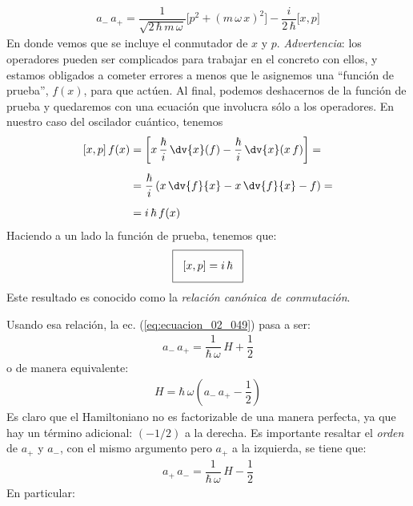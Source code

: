 \begin{align}
a_{-} \, a_{+} = \dfrac{1}{\sqrt{2 \, \hbar \, m \, \omega }} \big[ p^{2} + (m \, \omega \, x)^{2} \big] - \dfrac{i}{2 \, \hbar} \big[ x , p \big]
\label{eq:ecuacion_02_049}
\end{align}
En donde vemos que se incluye el conmutador de $x$ y $p$. 
\emph{Advertencia}: los operadores pueden ser complicados para trabajar en el concreto con ellos, y estamos obligados a cometer errores a menos que le asignemos una \enquote{función de prueba}, $f (x)$, para que actúen. Al final, podemos deshacernos de la función de prueba y quedaremos con una ecuación que involucra sólo a los operadores. En nuestro caso del oscilador cuántico, tenemos
\begin{align}
\begin{aligned}[b]
[x, p] \, f(x) &= \left[ x \, \dfrac{\hbar}{i} \, \dv{x} (f) - \dfrac{\hbar}{i} \, \dv{x} (x \, f) \right] = \\[0.5em]
&= \dfrac{\hbar}{i} \left( x \, \dv{f}{x} - x \,\dv{f}{x} - f \right) = \\[0.5em]
&= i \, \hbar \, f(x)
\end{aligned}
\label{eq:ecuacion_02_050}
\end{align}
Haciendo a un lado la función de prueba, tenemos que:
\begin{align}
\setlength{\fboxsep}{3\fboxsep}\boxed{
[x, p] = i \, \hbar
}
\label{eq:ecuacion_02_051}
\end{align}
Este resultado es conocido como la \emph{relación canónica de conmutación}.
\par
Usando esa relación, la ec. (\ref{eq:ecuacion_02_049}) pasa a ser:
\begin{align}
a_{-} \, a_{+} = \dfrac{1}{\hbar \, \omega} \, H + \dfrac{1}{2}
\label{ec:ecuacion_02_052}
\end{align}
o de manera equivalente:
\begin{align}
H = \hbar \, \omega \left( a_{-} \, a_{+} - \dfrac{1}{2} \right)
\label{ec:ecuacion_02_053}
\end{align}
Es claro que el Hamiltoniano no es factorizable de una manera perfecta, ya que hay un término adicional: $(-1/2)$ a la derecha. Es importante resaltar el \emph{orden} de $a_{+}$ y $a_{-}$, con el mismo argumento pero $a_{+}$ a la izquierda, se tiene que:
\begin{align}
a_{+} \, a_{-} = \dfrac{1}{\hbar \, \omega} \, H - \dfrac{1}{2}
\label{eq:ecuacion_02_054}
\end{align}
En particular:
